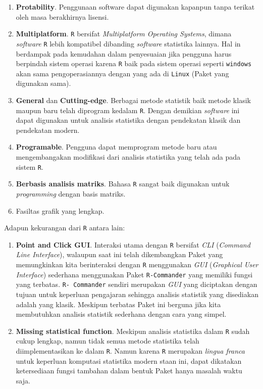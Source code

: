 \documentclass[
]{book}
\providecommand{\tightlist}{%
  \setlength{\itemsep}{0pt}\setlength{\parskip}{0pt}}
\theoremstyle{definition}
\theoremstyle{definition}
\theoremstyle{definition}
\theoremstyle{definition}
\theoremstyle{remark}
\begin{document}
\begin{enumerate}
\def\labelenumi{\arabic{enumi}.}
\tightlist
\item
  \textbf{Protability}. Penggunaan software dapat digunakan kapanpun tanpa terikat oleh masa berakhirnya lisensi.
\item
  \textbf{Multiplatform}. \texttt{R} bersifat \emph{Multiplatform Operating Systems}, dimana \emph{software} \texttt{R} lebih kompatibel dibanding \emph{software} statistika lainnya. Hal in berdampak pada kemudahan dalam penyesuaian jika pengguna harus berpindah sistem operasi karena \texttt{R} baik pada sistem operasi seperti \texttt{windows} akan sama pengoperasiannya dengan yang ada di \texttt{Linux} (Paket yang digunakan sama).
\item
  \textbf{General} dan \textbf{Cutting-edge}. Berbagai metode statistik baik metode klasik maupun baru telah diprogram kedalam \texttt{R}. Dengan demikian \emph{software} ini dapat digunakan untuk analisis statistika dengan pendekatan klasik dan pendekatan modern.
\item
  \textbf{Programable}. Pengguna dapat memprogram metode baru atau mengembangakan modifikasi dari analisis statistika yang telah ada pada sistem \texttt{R}.
\item
  \textbf{Berbasis analisis matriks}. Bahasa \texttt{R} sangat baik digunakan untuk \emph{programming} dengan basis matriks.
\item
  Fasiltas grafik yang lengkap.
\end{enumerate}

Adapun kekurangan dari \texttt{R} antara lain:

\begin{enumerate}
\def\labelenumi{\arabic{enumi}.}
\tightlist
\item
  \textbf{Point and Click GUI}. Interaksi utama dengan \texttt{R} bersifat \emph{CLI} (\emph{Command Line Interface}), walaupun saat ini telah dikembangkan Paket yang memungkinkan kita berinteraksi dengan \texttt{R} menggunakan \emph{GUI} (\emph{Graphical User Interface}) sederhana menggunakan Paket \texttt{R-Commander} yang memiliki fungsi yang terbatas. \texttt{R-\ Commander} sendiri merupakan \emph{GUI} yang diciptakan dengan tujuan untuk keperluan pengajaran sehingga analisis statistik yang disediakan adalah yang klasik. Meskipun terbatas Paket ini berguna jika kita membutuhkan analisis statistik sederhana dengan cara yang simpel.
\item
  \textbf{Missing statistical function}. Meskipun analisis statistika dalam \texttt{R} sudah cukup lengkap, namun tidak semua metode statistika telah diimplementasikan ke dalam \texttt{R}. Namun karena \texttt{R} merupakan \emph{lingua franca} untuk keperluan komputasi statistika modern staan ini, dapat dikatakan ketersediaan fungsi tambahan dalam bentuk Paket hanya masalah waktu saja.
\end{enumerate}
\end{document}
